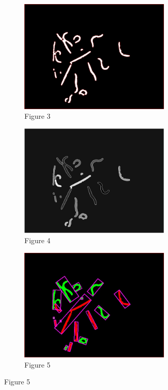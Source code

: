 \documentclass[a4paper,12pt]{article}
\begin{document}
\begin{figure}[ht!]
    \begin{subfigure}{0.5\textwidth}
        \centering
        \includegraphics[width=0.8\textwidth]{A01_step2.jpg}
        \captionsetup{labelformat=empty}
        \caption{Figure 3}
    \end{subfigure}%
    \begin{subfigure}{0.5\textwidth}
        \centering
        \includegraphics[width=0.8\textwidth]{A01_step2_markers.jpg}
        \captionsetup{labelformat=empty}
        \caption{Figure 4}
    \end{subfigure}
    \centering
    \begin{subfigure}{0.8\textwidth}
        \centering
        \includegraphics[width=0.8\textwidth]{A01_step3.jpg}
        \captionsetup{labelformat=empty}
        \caption{Figure 5}
    \end{subfigure}
\end{figure}
\end{document}
